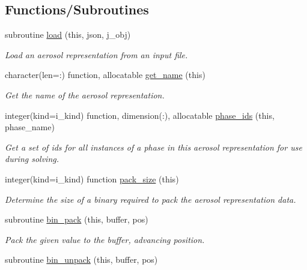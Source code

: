 \subsection*{Functions/\+Subroutines}
\begin{DoxyCompactItemize}
\item 
subroutine \mbox{\hyperlink{namespacepmc__aero__rep__data_a4f60a8dbb71b08bbd779ca689bc92849}{load}} (this, json, j\+\_\+obj)
\begin{DoxyCompactList}\small\item\em Load an aerosol representation from an input file. \end{DoxyCompactList}\item 
character(len=\+:) function, allocatable \mbox{\hyperlink{namespacepmc__aero__rep__data_a20e6255c5249c9fc6691e305676bb47c}{get\+\_\+name}} (this)
\begin{DoxyCompactList}\small\item\em Get the name of the aerosol representation. \end{DoxyCompactList}\item 
integer(kind=i\+\_\+kind) function, dimension(\+:), allocatable \mbox{\hyperlink{namespacepmc__aero__rep__data_a794f04d2ea273b301cde815c52c73e01}{phase\+\_\+ids}} (this, phase\+\_\+name)
\begin{DoxyCompactList}\small\item\em Get a set of ids for all instances of a phase in this aerosol representation for use during solving. \end{DoxyCompactList}\item 
integer(kind=i\+\_\+kind) function \mbox{\hyperlink{namespacepmc__aero__rep__data_a2f3aef419f1004c1ecebde0a448f415b}{pack\+\_\+size}} (this)
\begin{DoxyCompactList}\small\item\em Determine the size of a binary required to pack the aerosol representation data. \end{DoxyCompactList}\item 
subroutine \mbox{\hyperlink{namespacepmc__aero__rep__data_a41ef8540357a012a2cddda626aab5bae}{bin\+\_\+pack}} (this, buffer, pos)
\begin{DoxyCompactList}\small\item\em Pack the given value to the buffer, advancing position. \end{DoxyCompactList}\item 
subroutine \mbox{\hyperlink{namespacepmc__aero__rep__data_a67f039078092e889f0815368bbec4fa2}{bin\+\_\+unpack}} (this, buffer, pos)

\end{DoxyCompactItemize}
